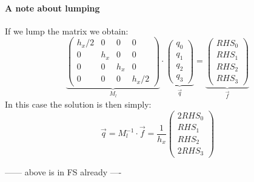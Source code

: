 \paragraph{A note about lumping} If we lump the matrix we obtain:
\begin{equation}
\underbrace{\left(
\begin{array}{cccc}
h_x/2 & 0  &  0 & 0\\
0 & h_x  & 0  & 0\\
0 & 0  & h_x  & 0 \\ 
0 & 0  &  0 & h_x/2
\end{array}
\right)}_{M_l}
\cdot
\underbrace{
\left(
\begin{array}{c}
q_0 \\ q_1 \\ q_2 \\ q_3
\end{array}
\right)
}_{\vec{q}}
=
\underbrace{
\left(
\begin{array}{c}
RHS_0 \\ RHS_1 \\ RHS_2 \\ RHS_3
\end{array}
\right)}_{\vec{f}}
\label{eq:mizu3}
\end{equation}
In this case the solution is then simply:
\[
\vec{q} = M_l^{-1} \cdot \vec{f}
=\frac{1}{h_x}
\left(
\begin{array}{c}
2RHS_0 \\ RHS_1 \\ RHS_2 \\ 2RHS_3
\end{array}
\right)
\]

------ above is  in FS already ----

